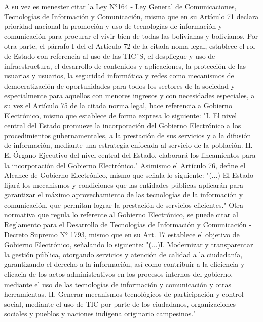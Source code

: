 A su vez es menester citar la Ley N°164 - Ley General de Comunicaciones, Tecnologías de Información y Comunicación, misma que en su Artículo 71 declara prioridad nacional la promoción y uso de tecnologías de información y comunicación para procurar el vivir bien de todas las bolivianas y bolivianos. Por otra parte, el párrafo I del el Artículo 72 de la citada noma legal, establece el rol de Estado con referencia al uso de las TIC´S, el despliegue y uso de infraestructura, el desarrollo de contenidos y aplicaciones, la protección de las usuarias y usuarios, la seguridad informática y redes como mecanismos de democratización de oportunidades para todos los sectores de la sociedad y especialmente para aquellos con menores ingresos y con necesidades especiales, a su vez el Artículo 75 de la citada norma legal, hace referencia a Gobierno Electrónico, mismo que establece de forma expresa lo siguiente: "I. El nivel central del Estado promueve la incorporación del Gobierno Electrónico a los procedimientos gubernamentales, a la prestación de sus servicios y a la difusión de información, mediante una estrategia enfocada al servicio de la población. II. El Órgano Ejecutivo del nivel central del Estado, elaborará los lineamientos para la incorporación del Gobierno Electrónico." Asimismo el Artículo 76, define el Alcance de Gobierno Electrónico, mismo que señala lo siguiente: "(...) El Estado fijará los mecanismos y condiciones que las entidades públicas aplicarán para garantizar el máximo aprovechamiento de las tecnologías de la información y comunicación, que permitan lograr la prestación de servicios eficientes." 
 Otra normativa que regula lo referente al Gobierno Electrónico, se puede citar al Reglamento para el Desarrollo de Tecnologías de Información y Comunicación - Decreto Supremo N° 1793, mismo que en su Art. 17 establece el objetivo de Gobierno Electrónico, señalando lo siguiente: "(...)I. Modernizar y transparentar la gestión pública, otorgando servicios y atención de calidad a la ciudadanía, garantizando el derecho a la información, así como contribuir a la eficiencia y eficacia de los actos administrativos en los procesos internos del gobierno, mediante el uso de las tecnologías de información y comunicación y otras herramientas. II. Generar mecanismos tecnológicos de participación y control social, mediante el uso de TIC por parte de los ciudadanos, organizaciones sociales y pueblos y naciones indígena originario campesinos."
